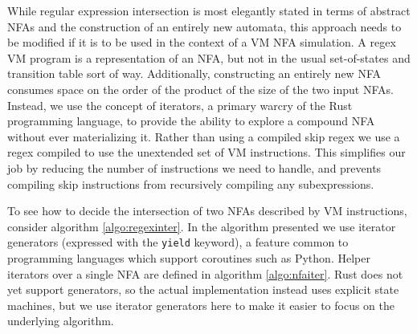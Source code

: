 While regular expression intersection is most elegantly stated
in terms of abstract NFAs and the construction of an entirely
new automata, this approach needs to be modified if it is
to be used in the context of a VM NFA simulation. A regex
VM program is a representation of an NFA, but not in the usual
set-of-states and transition
table sort of way. Additionally, constructing an entirely
new NFA consumes space on the order of the product of the
size of the two input NFAs. Instead, we use the concept of
iterators, a primary warcry of the Rust programming language,
to provide the ability to explore a compound NFA without
ever materializing it. Rather than using a compiled
skip regex we use a regex compiled to use the unextended
set of VM instructions. This simplifies our job by reducing
the number of instructions we need to handle, and prevents
compiling skip instructions from recursively compiling any
subexpressions.

To see how to decide the intersection of two NFAs described
by VM instructions, consider algorithm \ref{algo:regexinter}.
In the algorithm presented we use iterator generators
(expressed with the \verb'yield' keyword),
a feature common to programming languages which support coroutines
such as Python. Helper iterators over a single NFA are defined
in algorithm \ref{algo:nfaiter}. Rust does not yet support generators, so the
actual implementation instead uses explicit state machines, but
we use iterator generators here to make it easier to focus on the underlying
algorithm.

